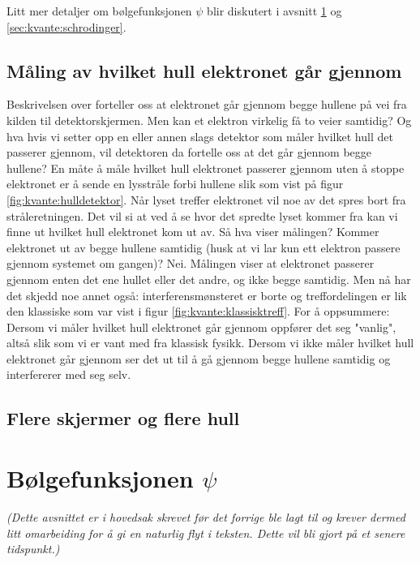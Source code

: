 Litt mer detaljer om bølgefunksjonen $\psi$ blir diskutert i avsnitt \ref{sec:kvante:psi} og \ref{sec:kvante:schrodinger}.

\subsection{Måling av hvilket hull elektronet går gjennom}
Beskrivelsen over forteller oss at elektronet går gjennom begge hullene på vei fra kilden til detektorskjermen. Men kan et elektron virkelig få to veier samtidig? Og hva hvis vi setter opp en eller annen slags detektor som måler hvilket hull det passerer gjennom, vil detektoren da fortelle oss at det går gjennom begge hullene? En måte å måle hvilket hull elektronet passerer gjennom uten å stoppe elektronet er å sende en lysstråle forbi hullene slik som vist på figur \ref{fig:kvante:hulldetektor}. Når lyset treffer elektronet vil noe av det spres bort fra stråleretningen. Det vil si at ved å se hvor det spredte lyset kommer fra kan vi finne ut hvilket hull elektronet kom ut av. Så hva viser målingen? Kommer elektronet ut av begge hullene samtidig (husk at vi lar kun ett elektron passere gjennom systemet om gangen)? Nei. Målingen viser at elektronet passerer gjennom enten det ene hullet eller det andre, og ikke begge samtidig. Men nå har det skjedd noe annet også: interferensmønsteret er borte og treffordelingen er lik den klassiske som var vist i figur \ref{fig:kvante:klassisktreff}. For å oppsummere: Dersom vi måler hvilket hull elektronet går gjennom oppfører det seg "vanlig", altså slik som vi er vant med fra klassisk fysikk. Dersom vi ikke måler hvilket hull elektronet går gjennom ser det ut til å gå gjennom begge hullene samtidig og interfererer med seg selv.

\subsection{Flere skjermer og flere hull}

\section{Bølgefunksjonen $\psi$}
\label{sec:kvante:psi}
\emph{(Dette avsnittet er i hovedsak skrevet før det forrige ble lagt til og krever dermed litt omarbeiding for å gi en naturlig flyt i teksten. Dette vil bli gjort på et senere tidspunkt.)} \\
\vspace{12pt}

